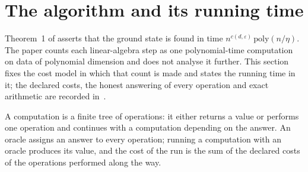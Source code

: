 \section{The algorithm and its running time}
\label{sec:lvv_query_model}

Theorem~1 of \cite{Landau2015Polynomial} asserts that the ground state is found
in time $n^{c(d,\varepsilon)}\,\mathrm{poly}(n/\eta)$. The paper counts each
linear-algebra step as one polynomial-time computation on data of polynomial
dimension and does not analyse it further. This section fixes the cost model in
which that count is made and states the running time in it; the declared
costs, the honest answering of every operation and exact arithmetic are
recorded in~\cite{gap:lvv13_cost_model}.

A computation is a finite tree of operations: it either returns a value or
performs one operation and continues with a computation depending on the
answer. An oracle assigns an answer to every operation; running a computation
with an oracle produces its value, and the cost of the run is the sum of the
declared costs of the operations performed along the way.

